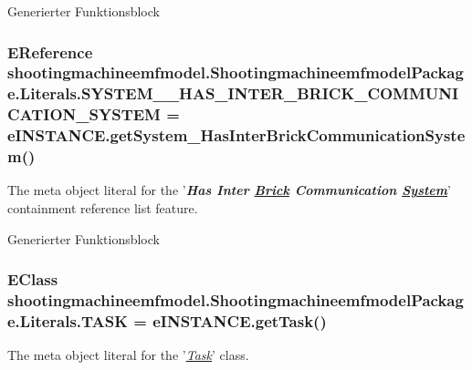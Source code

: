 Generierter Funktionsblock \hypertarget{interfaceshootingmachineemfmodel_1_1_shootingmachineemfmodel_package_1_1_literals_a9c206475bba2cf56ce9bc06a84add058}{
\subsubsection[{S\-Y\-S\-T\-E\-M\-\_\-\-\_\-\-H\-A\-S\-\_\-\-I\-N\-T\-E\-R\-\_\-\-B\-R\-I\-C\-K\-\_\-\-C\-O\-M\-M\-U\-N\-I\-C\-A\-T\-I\-O\-N\-\_\-\-S\-Y\-S\-T\-E\-M}]{\setlength{\rightskip}{0pt plus 5cm}E\-Reference shootingmachineemfmodel.\-Shootingmachineemfmodel\-Package.\-Literals.\-S\-Y\-S\-T\-E\-M\-\_\-\-\_\-\-H\-A\-S\-\_\-\-I\-N\-T\-E\-R\-\_\-\-B\-R\-I\-C\-K\-\_\-\-C\-O\-M\-M\-U\-N\-I\-C\-A\-T\-I\-O\-N\-\_\-\-S\-Y\-S\-T\-E\-M = e\-I\-N\-S\-T\-A\-N\-C\-E.\-get\-System\-\_\-\-Has\-Inter\-Brick\-Communication\-System()}}\label{interfaceshootingmachineemfmodel_1_1_shootingmachineemfmodel_package_1_1_literals_a9c206475bba2cf56ce9bc06a84add058}
The meta object literal for the '{\itshape {\bfseries Has Inter \hyperlink{interfaceshootingmachineemfmodel_1_1_brick}{Brick} Communication \hyperlink{interfaceshootingmachineemfmodel_1_1_system}{System}}}' containment reference list feature.

Generierter Funktionsblock \hypertarget{interfaceshootingmachineemfmodel_1_1_shootingmachineemfmodel_package_1_1_literals_ac7af0c94116439dc2bbf03b03620d74e}{
\subsubsection[{T\-A\-S\-K}]{\setlength{\rightskip}{0pt plus 5cm}E\-Class shootingmachineemfmodel.\-Shootingmachineemfmodel\-Package.\-Literals.\-T\-A\-S\-K = e\-I\-N\-S\-T\-A\-N\-C\-E.\-get\-Task()}}\label{interfaceshootingmachineemfmodel_1_1_shootingmachineemfmodel_package_1_1_literals_ac7af0c94116439dc2bbf03b03620d74e}
The meta object literal for the '\hyperlink{classshootingmachineemfmodel_1_1impl_1_1_task_impl}{{\itshape Task}}' class.

